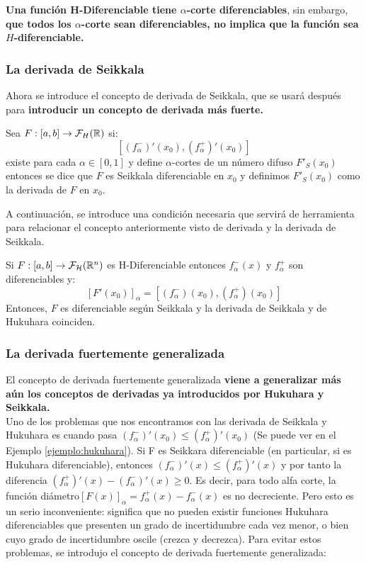 \textbf{Una función H-Diferenciable tiene $\alpha$-corte diferenciables}, sin embargo, \textbf{que todos los $\alpha$-corte sean diferenciables, no implica que la función sea $H$-diferenciable.}

\subsubsection{La derivada de Seikkala}
Ahora se introduce el concepto de derivada de Seikkala, que se usará después para \textbf{introducir un concepto de derivada más fuerte.}

\begin{definicion}
  Sea $F: [a, b] \rightarrow \mathcal{F}_H(\mathbb R)$ si:
  \[
    [(f^-_\alpha)'(x_0), (f^+_\alpha)'(x_0)]
    \]
    existe para cada $\alpha \in [0, 1]$ y define $\alpha$-cortes de un número difuso $F'_S(x_0)$ entonces se dice que $F$ es Seikkala diferenciable en $x_0$ y definimos $F'_S(x_0)$ como la derivada de $F$ en $x_0$.
\end{definicion}

A continuación, se introduce una condición necesaria que servirá de herramienta para relacionar el concepto anteriormente visto de derivada y la derivada de Seikkala.

\begin{teorema}
  Si $F: [a, b] \rightarrow \mathcal{F}_\mathcal{H}(\mathbb R^n)$ es H-Diferenciable entonces $f_\alpha^-(x)$ y $f_\alpha^+$ son diferenciables y:
  \[
    [F'(x_0)]_\alpha = [(f_\alpha^-)(x_0), (f_\alpha^+)(x_0)]
    \]
    Entonces, $F$ es diferenciable según Seikkala y la derivada de Seikkala y de Hukuhara coinciden.
\end{teorema}

\subsubsection{La derivada fuertemente generalizada}
El concepto de derivada fuertemente generalizada \textbf{viene a generalizar más aún los conceptos de derivadas ya introducidos por Hukuhara y Seikkala.} \\

Uno de los problemas que nos encontramos con las derivada de Seikkala y Hukuhara es cuando pasa $(f^-_\alpha)'(x_0) \leq (f^+_\alpha)'(x_0)$ (Se puede ver en el Ejemplo \ref{ejemplo:hukuhara}). Si F es Seikkara diferenciable (en particular, si es Hukuhara diferenciable), entonces $(f_{\alpha}^-)'(x) \le (f_{\alpha}^+)'(x)$ y por tanto la diferencia $(f_{\alpha}^+)'(x) - (f_{\alpha}^-)'(x) \ge 0$. Es decir, para todo alfa corte, la función diámetro$  [F(x)]_{\alpha} = f_{\alpha}^+(x) - f_{\alpha}^-(x)$ es no decreciente. Pero esto es un serio inconveniente: significa que no pueden existir funciones Hukuhara diferenciables que presenten un grado de incertidumbre cada vez menor, o bien cuyo grado de incertidumbre oscile (crezca y decrezca). Para evitar estos problemas, se introdujo el concepto de derivada fuertemente generalizada:

